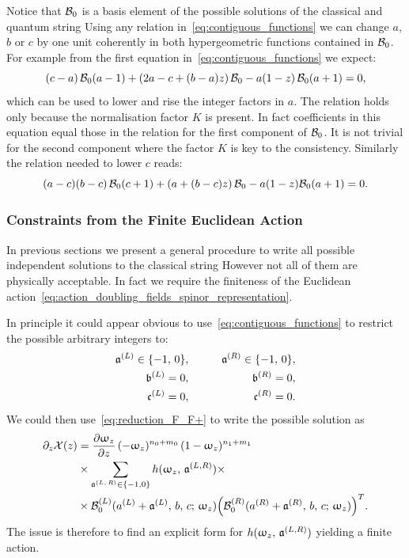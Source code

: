 Notice that $\mathcal{B}_{0}$ is a basis element of the possible solutions of the classical and quantum string \eom
Using any relation in~\eqref{eq:contiguous_functions} we can change $a$, $b$ or $c$ by one unit coherently in both hypergeometric functions contained in $\mathcal{B}_{0}$.
For example from the first equation in~\eqref{eq:contiguous_functions} we expect:
\begin{equation}
  (c-a)\, \mathcal{B}_{0}(a-1)
  +
  (2a-c+(b-a)z)\, \mathcal{B}_{0}
  -
  a(1-z)\, \mathcal{B}_{0}(a+1)
  =
  0,
\end{equation}
which can be used to lower and rise the integer factors in $a$.
The relation holds only because the normalisation factor $K$ is present.
In fact coefficients in this equation equal those in the relation for the first component of $\mathcal{B}_{0}$.
It is not trivial for the second component where the factor $K$ is key to the consistency.
Similarly the relation needed to lower $c$ reads:
\begin{equation}
  (a-c)(b-c)\, \mathcal{B}_{0}(c+1)
  +
  (a+(b-c)z)\, \mathcal{B}_{0}
  -
  a(1-z) \mathcal{B}_{0}(a+1)
  =
  0.
\end{equation}


\subsubsection{Constraints from the Finite Euclidean Action}

In previous sections we present a general procedure to write all possible independent solutions to the classical string \eom
However not all of them are physically acceptable.
In fact we require the finiteness of the Euclidean action~\eqref{eq:action_doubling_fields_spinor_representation}.

In principle it could appear obvious to use~\eqref{eq:contiguous_functions} to restrict the possible arbitrary integers to:
\begin{eqnarray}
  \mathfrak{a}^{(L)} \in \qty{ -1,\, 0 },
  & \qquad &
  \mathfrak{a}^{(R)} \in \qty{ -1,\, 0 },
  \\
  \mathfrak{b}^{(L)} = 0,
  & \qquad &
  \mathfrak{b}^{(R)} = 0,
  \\
  \mathfrak{c}^{(L)} = 0,
  & \qquad &
  \mathfrak{c}^{(R)} = 0.
\end{eqnarray}
We could then use~\eqref{eq:reduction_F_F+} to write the possible solution as
\begin{equation}
  \begin{split}
    \ipd{z} \cX(z)
    & =
    \pdv{\omega_z}{z}\,
    (-\omega_z)^{n_{0} + m_{0}}\,
    (1-\omega_z)^{n_{1} + m_{1}}
    \\
    & \times
    \sum\limits_{\ffa^{(L,\,R)} \in \qty{ -1, 0 }} 
    h(\omega_z,\, \ffa^{(L,R)})
    \times
    \\
    & \times
    \cB_{0}^{(L)}(a^{(L)} + \ffa^{(L)},\, b,\, c;\, \omega_z)
    \qty(
      \cB_{0}^{(R)}(a^{(R)} + \ffa^{(R)},\, b,\, c;\, \omega_z)
    )^T.
  \end{split}
  \label{eq:doubling_field_expansion}
\end{equation}
The issue is therefore to find an explicit form for $h(\upomega_z,\, \mathfrak{a}^{(L,R)})$ yielding a finite action.

